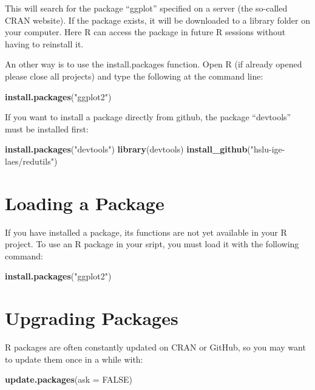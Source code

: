 \documentclass[
  a4paperpaper,
]{book}
\newenvironment{Shaded}{\begin{snugshade}}{\end{snugshade}}
\newcommand{\DataTypeTok}[1]{\textcolor[rgb]{0.13,0.29,0.53}{#1}}
\newcommand{\KeywordTok}[1]{\textcolor[rgb]{0.13,0.29,0.53}{\textbf{#1}}}
\newcommand{\NormalTok}[1]{#1}
\newcommand{\OtherTok}[1]{\textcolor[rgb]{0.56,0.35,0.01}{#1}}
\newcommand{\StringTok}[1]{\textcolor[rgb]{0.31,0.60,0.02}{#1}}
\let\oldShaded\Shaded
\let\endoldShaded\endShaded
\renewenvironment{Shaded}{\footnotesize\oldShaded}{\endoldShaded}
\begin{document}
This will search for the package ``ggplot'' specified on a server (the so-called CRAN website). If the package exists, it will be downloaded to a library folder on your computer. Here R can access the package in future R sessions without having to reinstall it.

An other way is to use the install.packages function.
Open R (if already opened please close all projects) and type the following at the command line:

\begin{Shaded}
\begin{Highlighting}[]
\KeywordTok{install.packages}\NormalTok{(}\StringTok{"ggplot2"}\NormalTok{)}
\end{Highlighting}
\end{Shaded}

If you want to install a package directly from github, the package ``devtools'' must be installed first:

\begin{Shaded}
\begin{Highlighting}[]
\KeywordTok{install.packages}\NormalTok{(}\StringTok{"devtools"}\NormalTok{)}
\KeywordTok{library}\NormalTok{(devtools)}
\KeywordTok{install_github}\NormalTok{(}\StringTok{"hslu-ige-laes/redutils"}\NormalTok{)}
\end{Highlighting}
\end{Shaded}

\newpage

\hypertarget{loading-a-package}{%
\section{Loading a Package}\label{loading-a-package}}

If you have installed a package, its functions are not yet available in your R project. To use an R package in your sript, you must load it with the following command:

\begin{Shaded}
\begin{Highlighting}[]
\KeywordTok{install.packages}\NormalTok{(}\StringTok{"ggplot2"}\NormalTok{)}
\end{Highlighting}
\end{Shaded}

\hypertarget{upgrading-packages}{%
\section{Upgrading Packages}\label{upgrading-packages}}

R packages are often constantly updated on CRAN or GitHub, so you may want to update them once in a while with:

\begin{Shaded}
\begin{Highlighting}[]
\KeywordTok{update.packages}\NormalTok{(}\DataTypeTok{ask =} \OtherTok{FALSE}\NormalTok{)}
\end{Highlighting}
\end{Shaded}
\end{document}

